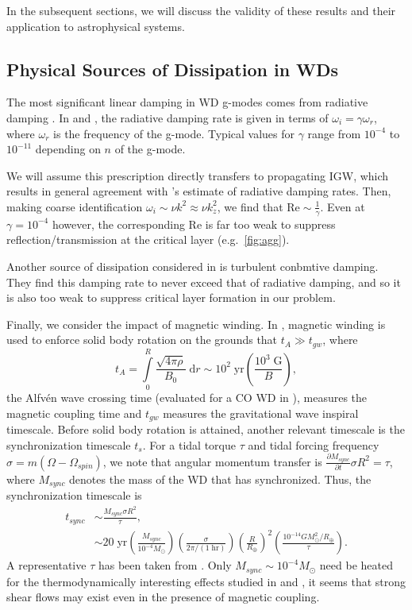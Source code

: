 \documentclass[
        fleqn,
        usenatbib,
        referee,
    ]{mnras}
\newcommand*{\pd}[2]{\frac{\partial#1}{\partial#2}}
\newcommand*{\p}[1]{\left(#1\right)}
\begin{document}
In the subsequent sections, we will discuss the validity of these results and
their application to astrophysical systems.

\subsection{Physical Sources of Dissipation in WDs}\label{ss:disp}

The most significant linear damping in WD g-modes comes from radiative damping
\citep{fullerI}. In \citep{wu} and \citep{fullerI}, the radiative damping rate
is given in terms of $\omega_i = \gamma \omega_r$, where $\omega_r$ is the
frequency of the g-mode. Typical values for $\gamma$ range from $10^{-4}$ to
$10^{-11}$ depending on $n$ of the g-mode.

We will assume this prescription directly transfers to propagating IGW, which
results in general agreement with \citep{bukart}'s estimate of radiative damping
rates. Then, making coarse identification $\omega_i \sim \nu k^2 \approx \nu
k_z^2$, we find that $\mathrm{Re} \sim \frac{1}{\gamma}$. Even at $\gamma =
10^{-4}$ however, the corresponding $\mathrm{Re}$ is far too weak to suppress
reflection/transmission at the critical layer (e.g.\ \autoref{fig:agg}).

Another source of dissipation considered in \citep{bukart} is turbulent
conbmtive damping. They find this damping rate to never exceed that of
radiative damping, and so it is also too weak to suppress critical layer
formation in our problem.

Finally, we consider the impact of magnetic winding. In \citep{bukart}, magnetic
winding is used to enforce solid body rotation on the grounds that $t_A \gg
t_{gw}$, where
\begin{equation}
    t_A = \int\limits_0^R \frac{\sqrt{4\pi \rho}}{B_0}\;\mathrm{d}r
        \sim 10^2\;\mathrm{yr}\p{\frac{10^3\;\mathrm{G}}{B}},
\end{equation}
the Alfv\'en wave crossing time (evaluated for a CO WD in \citealp{fullerIV}),
measures the magnetic coupling time and $t_{gw}$ measures the gravitational wave
inspiral timescale. Before solid body rotation is attained, another relevant
timescale is the synchronization timescale $t_s$. For a tidal torque $\tau$ and
tidal forcing frequency $\sigma = m\p{\Omega - \Omega_{spin}}$, we note that
angular momentum transfer is $\pd{M_{sync}}{t} \sigma R^2 = \tau$, where
$M_{sync}$ denotes the mass of the WD that has synchronized. Thus, the
synchronization timescale is
\begin{align}
    t_{sync} &\sim \frac{M_{sync}\sigma R^2}{\tau},\\
        &\sim 20\;\mathrm{yr}
            \p{\frac{M_{sync}}{10^{-4}M_{\odot}}}
            \p{\frac{\sigma}{2\pi / (1\;\mathrm{hr})}}
            \p{\frac{R}{R_{\oplus}}}^2
            \p{\frac{10^{-14} GM_{\odot}^2/R_{\oplus}}{\tau}}.
\end{align}
A representative $\tau$ has been taken from \citep{bukart}. Only $M_{sync} \sim
10^{-4}M_{\odot}$ need be heated for the thermodynamically interesting effects
studied in \citep{fullerIV} and \citep{tidal_novae}, it seems that strong shear
flows may exist even in the presence of magnetic coupling.
\end{document}
